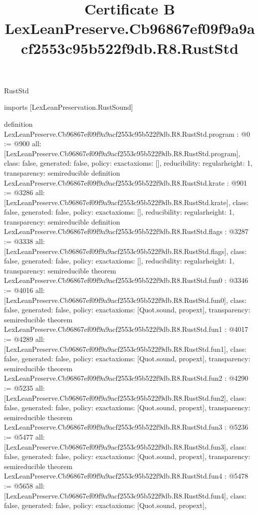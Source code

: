 \begin{lexlean}{RustStd}
\title{Certificate B LexLeanPreserve.Cb96867ef09f9a9acf2553c95b522f9db.R8.RustStd}
\begin{coremodule}
imports [LexLeanPreservation.RustSound]

definition LexLeanPreserve.Cb96867ef09f9a9acf2553c95b522f9db.R8.RustStd.program : @0 := @900 {
  all: [LexLeanPreserve.Cb96867ef09f9a9acf2553c95b522f9db.R8.RustStd.program],
  class: false,
  generated: false,
  policy: exact{axioms: []},
  reducibility: regular{height: 1},
  transparency: semireducible
}
definition LexLeanPreserve.Cb96867ef09f9a9acf2553c95b522f9db.R8.RustStd.krate : @901 := @3286 {
  all: [LexLeanPreserve.Cb96867ef09f9a9acf2553c95b522f9db.R8.RustStd.krate],
  class: false,
  generated: false,
  policy: exact{axioms: []},
  reducibility: regular{height: 1},
  transparency: semireducible
}
definition LexLeanPreserve.Cb96867ef09f9a9acf2553c95b522f9db.R8.RustStd.flags : @3287 := @3338 {
  all: [LexLeanPreserve.Cb96867ef09f9a9acf2553c95b522f9db.R8.RustStd.flags],
  class: false,
  generated: false,
  policy: exact{axioms: []},
  reducibility: regular{height: 1},
  transparency: semireducible
}
theorem LexLeanPreserve.Cb96867ef09f9a9acf2553c95b522f9db.R8.RustStd.fun0 : @3346 := @4016 {
  all: [LexLeanPreserve.Cb96867ef09f9a9acf2553c95b522f9db.R8.RustStd.fun0],
  class: false,
  generated: false,
  policy: exact{axioms: [Quot.sound, propext]},
  transparency: semireducible
}
theorem LexLeanPreserve.Cb96867ef09f9a9acf2553c95b522f9db.R8.RustStd.fun1 : @4017 := @4289 {
  all: [LexLeanPreserve.Cb96867ef09f9a9acf2553c95b522f9db.R8.RustStd.fun1],
  class: false,
  generated: false,
  policy: exact{axioms: [Quot.sound, propext]},
  transparency: semireducible
}
theorem LexLeanPreserve.Cb96867ef09f9a9acf2553c95b522f9db.R8.RustStd.fun2 : @4290 := @5235 {
  all: [LexLeanPreserve.Cb96867ef09f9a9acf2553c95b522f9db.R8.RustStd.fun2],
  class: false,
  generated: false,
  policy: exact{axioms: [Quot.sound, propext]},
  transparency: semireducible
}
theorem LexLeanPreserve.Cb96867ef09f9a9acf2553c95b522f9db.R8.RustStd.fun3 : @5236 := @5477 {
  all: [LexLeanPreserve.Cb96867ef09f9a9acf2553c95b522f9db.R8.RustStd.fun3],
  class: false,
  generated: false,
  policy: exact{axioms: [Quot.sound, propext]},
  transparency: semireducible
}
theorem LexLeanPreserve.Cb96867ef09f9a9acf2553c95b522f9db.R8.RustStd.fun4 : @5478 := @5658 {
  all: [LexLeanPreserve.Cb96867ef09f9a9acf2553c95b522f9db.R8.RustStd.fun4],
  class: false,
  generated: false,
  policy: exact{axioms: [Quot.sound, propext]},
}
\end{coremodule}
\end{lexlean}
